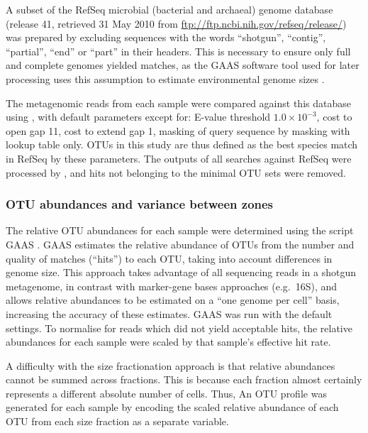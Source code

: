 A subset of the RefSeq microbial (bacterial and archaeal) genome database (release 41, retrieved 31 May 2010 from \url{ftp://ftp.ncbi.nih.gov/refseq/release/}) was prepared by excluding sequences with the words ``shotgun'', ``contig'', ``partial'', ``end'' or ``part'' in their headers.
This is necessary to ensure only full and complete genomes yielded matches, as the \ac{GAAS} software tool used for later processing uses this assumption to estimate environmental genome sizes \citep[following][]{Angly:2009ip}.

The metagenomic reads from each sample were compared against this database using , with default parameters except for: E-value threshold $1.0\times{}10^{-3}$, cost to open gap 11, cost to extend gap 1, masking of query sequence by  masking with lookup table only.
\acp{OTU} in this study are thus defined as the best species match in RefSeq by these parameters.
The outputs of all  searches against RefSeq were processed by , and hits not belonging to the minimal \ac{OTU} sets were removed.

\subsubsection{OTU abundances and variance between zones}

The relative \ac{OTU} abundances for each sample were determined using the  script \ac{GAAS} \cite{Angly:2009ip}.
\ac{GAAS} estimates the relative abundance of \acp{OTU} from the number and quality of  matches (``hits'') to each \ac{OTU}, taking into account differences in genome size. 
This approach takes advantage of all sequencing reads in a shotgun metagenome, in contrast with marker-gene bases approaches (e.g.\ 16S), and allows relative abundances to be estimated on a ``one genome per cell'' basis, increasing the accuracy of these estimates.
\ac{GAAS} was run with the default settings. 
To normalise for reads which did not yield acceptable hits, the relative abundances for each sample were scaled by that sample's effective  hit rate.

A difficulty with the size fractionation approach is that relative abundances cannot be summed across fractions.
This is because each fraction almost certainly represents a different absolute number of cells.
Thus, 
An \ac{OTU} profile was generated for each sample by encoding the scaled relative abundance of each \ac{OTU} from each size fraction as a separate variable.

